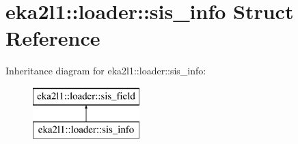 \hypertarget{structeka2l1_1_1loader_1_1sis__info}{}\section{eka2l1\+:\+:loader\+:\+:sis\+\_\+info Struct Reference}
\label{structeka2l1_1_1loader_1_1sis__info}
Inheritance diagram for eka2l1\+:\+:loader\+:\+:sis\+\_\+info\+:\begin{figure}[H]
\begin{center}
\leavevmode
\includegraphics[height=2.000000cm]{structeka2l1_1_1loader_1_1sis__info}
\end{center}
\end{figure}
